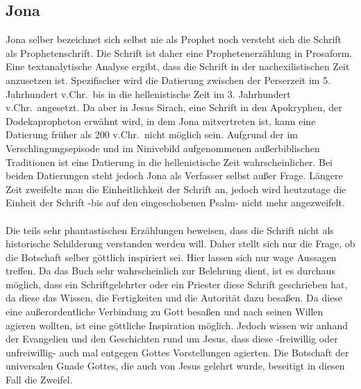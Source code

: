 \subsection*{Jona}
Jona selber bezeichnet sich selbst nie als Prophet noch versteht sich die Schrift als Prophetenschrift. Die Schrift ist daher eine Prophetenerzählung in Prosaform. Eine textanalytische Analyse ergibt, dass die Schrift in der nachexilistischen Zeit anzusetzen ist. Spezifischer wird die Datierung zwischen der Perserzeit im 5. Jahrhundert v.Chr.\ bis in die hellenistische Zeit im 3. Jahrhundert v.Chr.\ angesetzt. Da aber in Jesus Sirach, eine Schrift in den Apokryphen, der Dodekapropheton erwähnt wird, in dem Jona mitvertreten ist, kann eine Datierung früher als 200 v.Chr.\ nicht möglich sein. Aufgrund der im Verschlingungsepisode und im Ninivebild aufgenommenen außerbiblischen Traditionen ist eine Datierung in die hellenistische Zeit wahrscheinlicher. Bei beiden Datierungen steht jedoch Jona als Verfasser selbst außer Frage. Längere Zeit zweifelte man die Einheitlichkeit der Schrift an, jedoch wird heutzutage die Einheit der Schrift -bis auf den eingeschobenen Psalm- nicht mehr angezweifelt.
\\~\\
Die teils sehr phantastischen Erzählungen beweisen, dass die Schrift nicht als historische Schilderung verstanden werden will. Daher stellt sich nur die Frage, ob die Botschaft selber göttlich inspiriert sei. Hier lassen sich nur wage Aussagen treffen. Da das Buch sehr wahrscheinlich zur Belehrung dient, ist es durchaus möglich, dass ein Schriftgelehrter oder ein Priester diese Schrift geschrieben hat, da diese das Wissen, die Fertigkeiten und die Autorität dazu besaßen. Da diese eine außerordentliche Verbindung zu Gott besaßen und nach seinen Willen agieren wollten, ist eine göttliche Inspiration möglich. Jedoch wissen wir anhand der Evangelien und den Geschichten rund um Jesus, dass diese -freiwillig oder unfreiwillig- auch mal entgegen Gottes Vorstellungen agierten. Die Botschaft der universalen Gnade Gottes, die auch von Jesus gelehrt wurde, beseitigt in diesen Fall die Zweifel.

